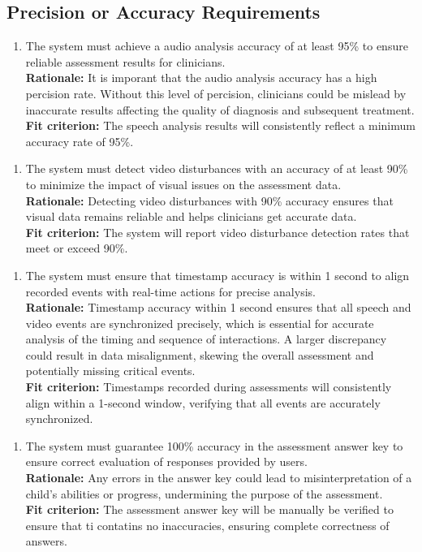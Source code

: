 \documentclass[12pt]{article}
\begin{document}
\subsection{Precision or Accuracy Requirements}
\begin{enumerate}[{PR-PA}1. ]
  \item The system must achieve a audio analysis accuracy of at least 95\% to ensure reliable assessment results for clinicians.\\
  \textbf{Rationale: }It is imporant that the audio analysis accuracy has a high percision rate. Without this level of percision, clinicians could 
  be mislead by inaccurate results affecting the quality of diagnosis and subsequent treatment.\\
  \textbf{Fit criterion: }The speech analysis results will consistently reflect a minimum accuracy rate of 95\%.  
\end{enumerate}
\begin{enumerate}[{PR-PA}2. ]
  \item The system must detect video disturbances with an accuracy of at least 90\% to minimize the impact of visual issues on the assessment data.\\
  \textbf{Rationale: }Detecting video disturbances with 90\% accuracy ensures that visual data remains reliable and helps clinicians get accurate data.\\
  \textbf{Fit criterion: }The system will report video disturbance detection rates that meet or exceed 90\%.  
\end{enumerate}
\begin{enumerate}[{PR-PA}3. ]
  \item The system must ensure that timestamp accuracy is within 1 second to align recorded events with real-time actions for precise analysis.\\
  \textbf{Rationale: }Timestamp accuracy within 1 second ensures that all speech and video events are synchronized precisely, which is essential for accurate analysis of the timing and sequence of interactions. A larger discrepancy could result in data misalignment, skewing the overall assessment and potentially missing critical events.\\
  \textbf{Fit criterion: }Timestamps recorded during assessments will consistently align within a 1-second window, verifying that all events are accurately synchronized.  
\end{enumerate}
\begin{enumerate}[{PR-PA}4. ]
  \item The system must guarantee 100\% accuracy in the assessment answer key to ensure correct evaluation of responses provided by users.\\
  \textbf{Rationale: }Any errors in the answer key could lead to misinterpretation of a child’s abilities or progress, undermining the purpose of the assessment.\\
  \textbf{Fit criterion: }The assessment answer key will be manually be verified to ensure that ti contatins no inaccuracies, ensuring complete correctness of answers.  
\end{enumerate}
\end{document}
